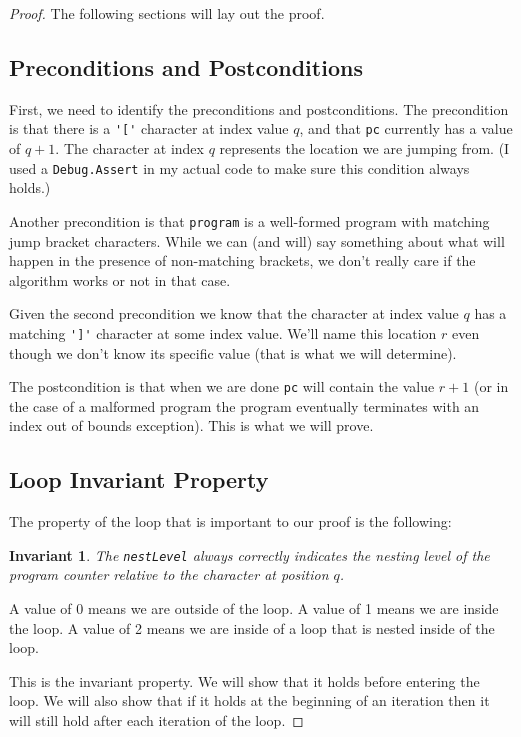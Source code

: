 \documentclass[10pt]{amsart}
\newcommand{\inl}{\lstinline[breaklines=true]}
\newtheorem*{invariant}{Invariant}
\begin{document}
\begin{proof}
The following sections will lay out the proof.

\subsection*{Preconditions and Postconditions}
First, we need to identify the preconditions and postconditions. The
precondition is that there is a \inl!'['! character at index value $q$, and
that \inl!pc! currently has a value of $q + 1$. The
character at index $q$ represents the location we are jumping from.
(I used a \inl!Debug.Assert! in my actual code to make sure this condition
always holds.) 

Another precondition is that \inl!program! is a well-formed program with
matching jump bracket characters. While we can (and will) say something
about what will happen in the presence of non-matching brackets, we
don't really care if the algorithm works or not in that case.

Given the second precondition we know that the character at index value
$q$ has a matching \inl!']'! character at some index value. We'll name
this location $r$ even though we don't know its specific value (that
is what we will determine).

The postcondition is that when we are done \inl!pc! will
contain the value $r + 1$ (or in the case of a malformed program
the program eventually terminates with an index out of bounds exception).
This is what we will prove.

\subsection*{Loop Invariant Property}
The property of the loop that is important to our proof is the following: 

\begin{invariant}
The \inl!nestLevel! always correctly indicates the nesting level of the
program counter relative to the character at position $q$. 
\end{invariant}

A value of 0 means
we are outside of the loop. A value of 1 means we are inside the loop.
A value of 2 means we are inside of a loop that is nested inside
of the loop.

This is the invariant property. We will show that it holds before entering the
loop.  We will also show that if it holds at the beginning of an
iteration then it will still hold after each iteration of the loop.



\end{proof}
\end{document}
